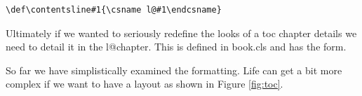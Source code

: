 \documentclass[10pt]{book}
\makeatletter
\newif\if@tocimage \@tocimagefalse
\newcounter{img}
\renewcommand*\l@chapter[2]{%
\def\toccustom##1##2{%
 \par\vspace*{10pt}
        ##1\toctitleafter@cx##2\par\vspace*{-10pt}
        \hspace*{-2.1cm}\vbox to 0pt{\par\rule{.01pt}{22pt}\par
        \IfFileExists{./chapters/tocblock\theimg.JPG}{%
           \texttt{[image: tocblock\\theimg]}}\par\vspace*{\tocchapterafter@cx}
        }{\vspace*{10pt}}
 \stepcounter{img}
}


  \ifnum \c@tocdepth >\m@ne
    \addpenalty{-\@highpenalty}%
    \vskip 1.0em \@plus\p@
    \setlength\@tempdima{1.5em}%
    \begingroup
      \parindent \z@ %
      \if@tocimage
           \toccustom{#1}{#2}%
     \else
         #1\toctitleafter@cx#2\par\vspace*{-10pt}%
        \hspace*{-2.1cm}%
     \fi
     
     \penalty\@highpenalty
    \endgroup
\fi}
\makeatother
\begin{document}
\begin{tcolorbox}
\begin{lstlisting}
\def\contentsline#1{\csname l@#1\endcsname}  
\end{lstlisting}
\end{tcolorbox}

Ultimately if we wanted to seriously redefine the looks of a  toc chapter details we need to detail it in the l@chapter. This is defined in book.cls and has the form.



So far we have simplistically examined the formatting. Life can get a bit more complex if we want to have a layout as shown in Figure \ref{fig:toc}.
\end{document}
